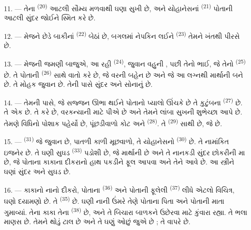 11. --- તેના  \textsuperscript{(20)} આટલી સૌમ્ય
 મળવાથી ઘણા સુખી છે, અને યોહાનેસનાં 
\textsuperscript{(21)} પોતાની  આટલી સુંદર જોઈને સ્મિત
કરે છે.

12. --- મેજને છેડે બાકીનાં  \textsuperscript{(22)}
બેઠાં છે, 
બગલમાં નેપકિન લઈને  \textsuperscript{(23)} તેમને
ખંતથી પીરસે છે.

\VUsaut{3.0mm}

13. --- મેજની જમણી બાજુએ, આ રહી 
\textsuperscript{(24)}, જુવાન વહુની , પછી તેનો ભાઈ, જે
તેનો  \textsuperscript{(25)} છે. તે પોતાની
 \textsuperscript{(26)} સાથે વાતો કરે છે, જે વરની
બહેન છે અને જે આ લગ્નથી માર્થાની  બને છે. તે મોહક જુવાન
છે. તેની પાસે સુંદર   અને સોનાનું
 છે.

14. --- તેમની પાસે, જે સજ્જન ઊભા થઈને પોતાનો પ્યાલો ઊંચકે છે તે
કુટુંબના  \textsuperscript{(27)} છે. તે  એક છે. તે  કરે છે, વરકન્યાની
 માટે પીએ છે અને તેમને લાંબા સુખની શુભેચ્છા આપે છે.
તેમણે વિધિનો પોશાક પહેર્યો છે, પૂંછડીવાળો કોટ અને  \textsuperscript{(28)}. તે 
\textsuperscript{(29)} સાથી છે, જે  છે.

15. ---  \textsuperscript{(31)} જે જુવાન છે,
પાતળી કાળી મૂછવાળો, તે યોહાનેસનો  \textsuperscript{(30)}
છે. તે નામાંકિત ઇજનેર છે. તે ઘણી સુઘડ 
\textsuperscript{(33)} પડોશી છે, જે માર્થાની  છે અને
તે નાનકડી સુંદર છોકરીની મા છે, જે પોતાના કાકાના દીકરાનો હાથ પકડીને
ફૂલ આપવા અને તેને   આવે છે. આ
સ્ત્રીને ઘણાં સુંદર  અને સુઘડ  છે.

16. --- કાકાનો નાનો દીકરો, પોતાના 
\textsuperscript{(36)} અને પોતાની ફૂલેલી 
\textsuperscript{(37)} લીધે એટલો વિચિત્ર, ઘણો દયામણો છે. તે
 \textsuperscript{(35)} છે. ઘણી નાની ઉંમરે તેણે પોતાના
પિતા અને પોતાની માતા ગુમાવ્યાં. તેના કાકા તેના 
\textsuperscript{(38)} છે, અને તે બિચારા બાળકને ઉછેરવા માટે કુંવારા
રહ્યા. તે ભલા માણસ છે. તેમને થોડું ટાલ છે અને તે ઘણું ઓછું જુએ છે ; તે
 વાપરે છે.

